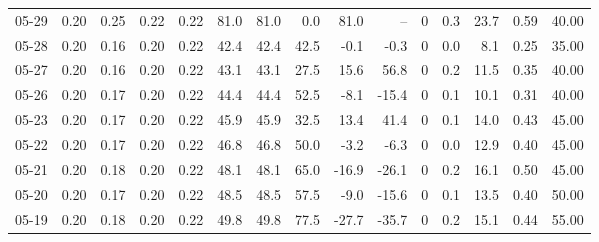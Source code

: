 \begin{threeparttable}
{\begin{tabular}{lrrrrrrrrrrrrrr}
  05-29 &          0.20 &          0.25 &          0.22 &        0.22 &                81.0 &               81.0 &                 0.0 &       81.0 &           -- &              0 &                 0.3 &             23.7 &            0.59 &                  40.00 \\
  05-28 &          0.20 &          0.16 &          0.20 &        0.22 &                42.4 &               42.4 &                42.5 &       -0.1 &         -0.3 &              0 &                 0.0 &              8.1 &            0.25 &                  35.00 \\
  05-27 &          0.20 &          0.16 &          0.20 &        0.22 &                43.1 &               43.1 &                27.5 &       15.6 &         56.8 &              0 &                 0.2 &             11.5 &            0.35 &                  40.00 \\
  05-26 &          0.20 &          0.17 &          0.20 &        0.22 &                44.4 &               44.4 &                52.5 &       -8.1 &        -15.4 &              0 &                 0.1 &             10.1 &            0.31 &                  40.00 \\
  05-23 &          0.20 &          0.17 &          0.20 &        0.22 &                45.9 &               45.9 &                32.5 &       13.4 &         41.4 &              0 &                 0.1 &             14.0 &            0.43 &                  45.00 \\
  05-22 &          0.20 &          0.17 &          0.20 &        0.22 &                46.8 &               46.8 &                50.0 &       -3.2 &         -6.3 &              0 &                 0.0 &             12.9 &            0.40 &                  45.00 \\
  05-21 &          0.20 &          0.18 &          0.20 &        0.22 &                48.1 &               48.1 &                65.0 &      -16.9 &        -26.1 &              0 &                 0.2 &             16.1 &            0.50 &                  45.00 \\
  05-20 &          0.20 &          0.17 &          0.20 &        0.22 &                48.5 &               48.5 &                57.5 &       -9.0 &        -15.6 &              0 &                 0.1 &             13.5 &            0.40 &                  50.00 \\
  05-19 &          0.20 &          0.18 &          0.20 &        0.22 &                49.8 &               49.8 &                77.5 &      -27.7 &        -35.7 &              0 &                 0.2 &             15.1 &            0.44 &                  55.00 \\

\end{tabular}}
\end{threeparttable}
